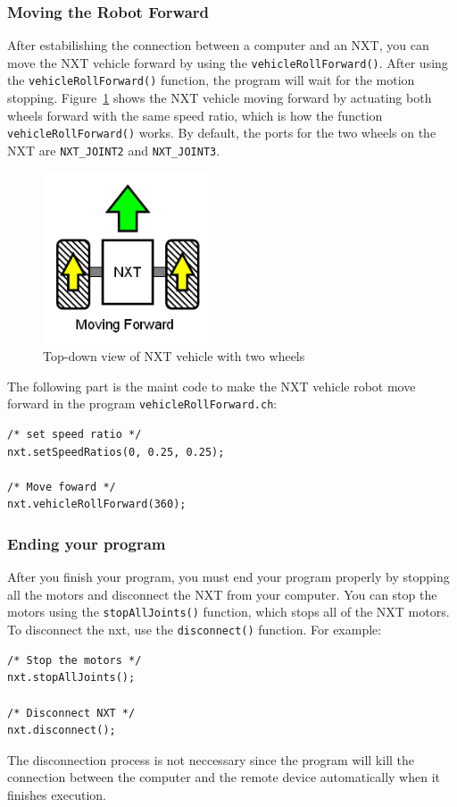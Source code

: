 \documentclass[11pt]{article}
\begin{document}
\subsubsection{Moving the Robot Forward}
After estabilishing the connection between a computer and an NXT, you can move 
the NXT vehicle forward by using the {\tt vehicleRollForward()}. After using the 
{\tt vehicleRollForward()} function, the program will wait for the motion stopping. 
Figure~\ref{fig_NXT_forward} shows the NXT vehicle moving forward by actuating 
both wheels forward with the same speed ratio, which is how the function 
{\tt vehicleRollForward()} works. By default, the ports for the two wheels on the 
NXT are {\tt NXT\_JOINT2} and {\tt NXT\_JOINT3}.
\begin{figure}[H]
  \begin{center}
    \includegraphics[height=2in]{figure/mindstorm/Vehicle_forward.png}
    \caption{Top-down view of NXT vehicle with two wheels\label{fig_NXT_forward}}
  \end{center}
\end{figure}
The following part is the maint code to make the NXT vehicle robot move forward 
in the program {\tt vehicleRollForward.ch}:
\begin{lstlisting}
/* set speed ratio */
nxt.setSpeedRatios(0, 0.25, 0.25);

/* Move foward */
nxt.vehicleRollForward(360);
\end{lstlisting}

\subsubsection{Ending your program}
After you finish your program, you must end your program properly by stopping 
all the motors and disconnect the NXT from your computer. You can stop the 
motors using the {\tt stopAllJoints()} function, which stops all of the NXT 
motors. To disconnect the nxt, use the {\tt disconnect()} function. For example:
\begin{lstlisting}
/* Stop the motors */
nxt.stopAllJoints();
    
/* Disconnect NXT */
nxt.disconnect();
\end{lstlisting}
The disconnection process is not neccessary since the program will kill the 
connection between the computer and the remote device automatically when it 
finishes execution.
\end{document}
